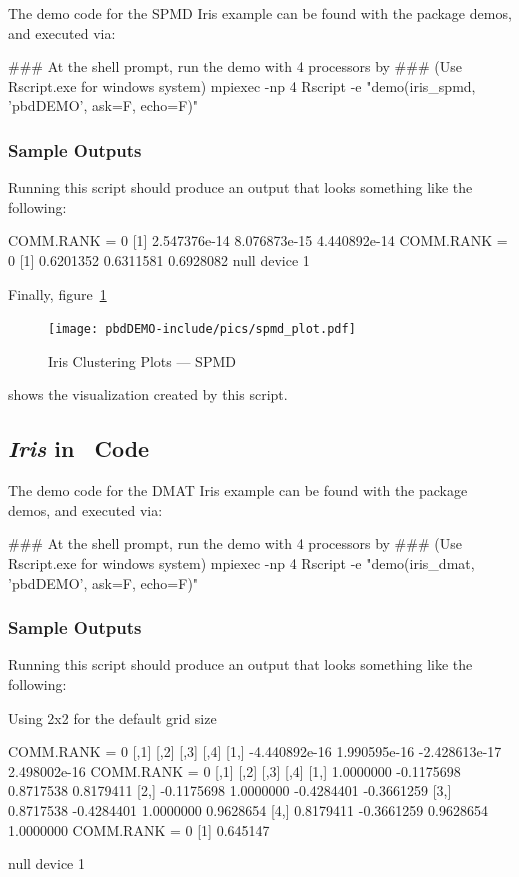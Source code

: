 The demo code for the SPMD Iris example can be found with the package
demos, and executed via:
\begin{Command}
### At the shell prompt, run the demo with 4 processors by
### (Use Rscript.exe for windows system)
mpiexec -np 4 Rscript -e "demo(iris_spmd, 'pbdDEMO', ask=F, echo=F)"
\end{Command}

\subsubsection{Sample Outputs}
Running this script should produce an output that looks something like the following:
\begin{Output}
COMM.RANK = 0
[1] 2.547376e-14 8.076873e-15 4.440892e-14
COMM.RANK = 0
[1] 0.6201352 0.6311581 0.6928082
null device 
          1 
\end{Output}

Finally, figure~\ref{fig:iris_cluster_spmd}
\begin{figure}[h!bt]
  \centering
  \texttt{[image: pbdDEMO-include/pics/spmd\_plot.pdf]}
  \caption{Iris Clustering Plots --- SPMD}
  \label{fig:iris_cluster_spmd}
\end{figure}
shows the visualization created by this script.




\subsection{{\it Iris} in \ Code}

The demo code for the DMAT Iris example can be found with the package demos,
and executed via:
\begin{Command}
### At the shell prompt, run the demo with 4 processors by
### (Use Rscript.exe for windows system)
mpiexec -np 4 Rscript -e "demo(iris_dmat, 'pbdDEMO', ask=F, echo=F)"
\end{Command}


\subsubsection{Sample Outputs}
Running this script should produce an output that looks something like the
following:
\begin{Output}
Using 2x2 for the default grid size

COMM.RANK = 0
              [,1]         [,2]          [,3]         [,4]
[1,] -4.440892e-16 1.990595e-16 -2.428613e-17 2.498002e-16
COMM.RANK = 0
           [,1]       [,2]       [,3]       [,4]
[1,]  1.0000000 -0.1175698  0.8717538  0.8179411
[2,] -0.1175698  1.0000000 -0.4284401 -0.3661259
[3,]  0.8717538 -0.4284401  1.0000000  0.9628654
[4,]  0.8179411 -0.3661259  0.9628654  1.0000000
COMM.RANK = 0
[1] 0.645147

null device 
          1 
\end{Output}

